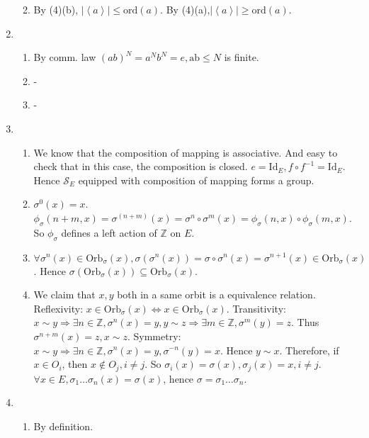 \documentclass[12pt]{article}
\newcommand{\ZZ}{\mathbb{Z}}
\begin{document}
\begin{enumerate}
\begin{enumerate}
\begin{enumerate}
                \end{enumerate}
            \item By (4)(b), $\left|\left \langle a \right \rangle \right|\le \mathrm{ord}(a)$. By (4)(a),$\left|\left \langle a \right \rangle \right|\ge \mathrm{ord}(a)$.
        \end{enumerate}
    \item 
        \begin{enumerate}
            \item By comm. law $(ab)^{N}=a^N b^N=e, \mathrm{ab}\le N$ is finite.
            \item -
            \item -
        \end{enumerate}
    \item 
        \begin{enumerate}
            \item We know that the composition of mapping is associative. And easy to check that in this case, the composition is closed. $e=\mathrm{Id}_E,f\circ f^{-1}=\mathrm{Id}_E$. Hence $\mathcal{S}_E$ equipped with composition of mapping forms a group.
            \item $\sigma^0(x)=x$. $\phi_\sigma(n+m,x)=\sigma^{(n+m)}(x)=\sigma^n\circ\sigma^m(x)=\phi_\sigma(n,x)\circ\phi_{\sigma}(m,x)$. So $\phi_\sigma$ defines a left action of $\ZZ$ on $E$.
            \item $\forall\sigma^n(x)\in \mathrm{Orb}_\sigma(x), \sigma(\sigma^n(x))=\sigma\circ\sigma^n(x)=\sigma^{n+1}(x)\in \mathrm{Orb}_\sigma(x)$. Hence $\sigma(\mathrm{Orb}_\sigma(x))\subseteq \mathrm{Orb}_\sigma(x)$.
            \item We claim that $x,y$ both in a same orbit is a equivalence relation. Reflexivity: $x\in \mathrm{Orb}_\sigma(x)\Leftrightarrow x\in \mathrm{Orb}_\sigma(x) $. Transitivity: $x\sim y\Rightarrow \exists n\in \ZZ, \sigma^n(x)=y, y\sim z\Rightarrow \exists m\in \ZZ, \sigma^m(y)=z$. Thus $\sigma^{n+m}(x)=z, x\sim z$. Symmetry: $x\sim y\Rightarrow \exists n\in \ZZ, \sigma^n(x)=y, \sigma^{-n}(y)=x$. Hence $y\sim x$. Therefore, if $x\in O_i$, then $x\notin O_j,i\not=j$. So $\sigma_i(x)=\sigma(x),\sigma_j(x)=x,i\not=j$. $\forall x\in E, \sigma_1\dots\sigma_n(x)=\sigma(x)$, hence $\sigma=\sigma_1\dots\sigma_n$.
        \end{enumerate}
    \item 
        \begin{enumerate}
            \item By definition.

\end{enumerate}
\end{enumerate}
\end{document}
